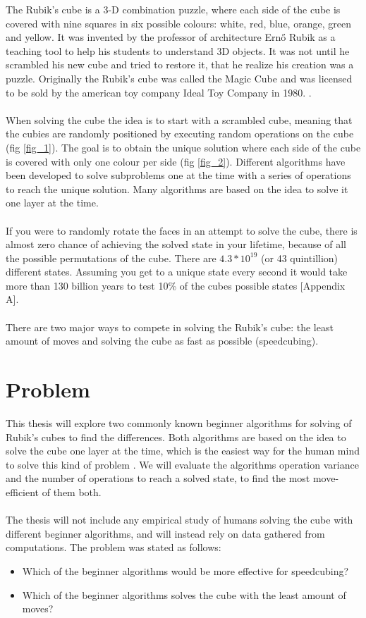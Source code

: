 \documentclass[a4paper,11pt]{kth-mag}
\begin{document}
The Rubik’s cube is a 3-D combination puzzle, where each side of the cube is covered with nine squares in six possible colours: white, red, blue, orange, green and yellow. It was invented by the professor of architecture Ernő Rubik as a teaching tool to help his students to understand 3D objects. It was not until he scrambled his new cube and tried to restore it, that he realize his creation was a puzzle. Originally the Rubik's cube was called the Magic Cube and was licensed to be sold by the american toy company Ideal Toy Company in 1980. \cite{Rubiks}.\\\\
When solving the cube the idea is to start with a scrambled cube, meaning that the cubies are randomly positioned by executing random operations on the cube (fig \ref{fig_1}). The goal is to obtain the unique solution where each side of the cube is covered with only one colour per side (fig \ref{fig_2}). Different algorithms have been developed to solve subproblems one at the time with a series of operations to reach the unique solution. Many algorithms are based on the idea to solve it one layer at the time.\\\\
If you were to randomly rotate the faces in an attempt to solve the cube, there is almost zero chance of achieving the solved state in your lifetime, because of all the possible permutations of the cube. There are $4.3 * 10^{19}$ (or 43 quintillion) \cite{Faculty} different states. Assuming you get to a unique state every second it would take more than 130 billion years to test 10\% of the cubes possible states [Appendix A].\\\\
There are two major ways to compete in solving the Rubik’s cube: the least amount of moves and solving the cube as fast as possible (speedcubing).

\section{Problem}
This thesis will explore two commonly known beginner algorithms for solving of Rubik’s cubes to find the differences. Both algorithms are based on the idea to solve the cube one layer at the time, which is the easiest way for the human mind to solve this kind of problem \cite{Lar5}. We will evaluate the algorithms operation variance and the number of operations to reach a solved state, to find the most move-efficient of them both.\\\\
The thesis will not include any empirical study of humans solving the cube with different beginner algorithms, and will instead rely on data gathered from computations.
The problem was stated as follows:
\begin{itemize}
\item[] Which of the beginner algorithms would be more effective for speedcubing?
\item[] Which of the beginner algorithms solves the cube with the least amount of moves?
\end{itemize}
\end{document}
